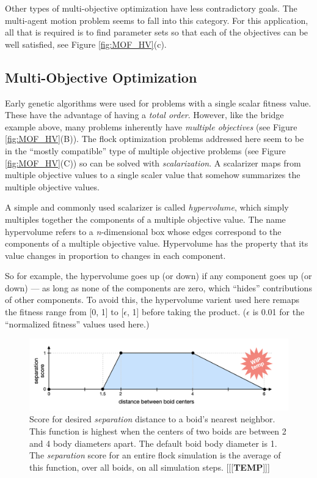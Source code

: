 \documentclass[letterpaper]{article}
\begin{document}
Other types of multi-objective optimization have less contradictory goals. The multi-agent motion problem seems to fall into this category. For this application, all that is required is to find parameter sets so that each of the objectives can be well satisfied, see Figure \ref{fig:MOF_HV}(c).

\subsection{Multi-Objective Optimization}
\label{subsec:Multi-Objective}

Early genetic algorithms were used for problems with a single scalar fitness value. These have the advantage of having a \textit{total order}. However, like the bridge example above, many problems inherently have \textit{multiple objectives} (see Figure \ref{fig:MOF_HV}(B)). The flock optimization problems addressed here seem to be in the ``mostly compatible'' type of multiple objective problems (see Figure \ref{fig:MOF_HV}(C)) so can be solved with \textit{scalarization}. A scalarizer maps from multiple objective values to a single scaler value that somehow summarizes the multiple objective values.

A simple and commonly used scalarizer is called \textit{hypervolume}, which simply multiples together the components of a multiple objective value. The name hypervolume refers to a \textit{n}-dimensional box whose edges correspond to the components of a multiple objective value. Hypervolume has the property that its value changes in proportion to changes in each component.

So for example, the hypervolume goes up (or down) if any component goes up (or down) --- as long as none of the components are zero, which ``hides'' contributions of other components. To avoid this, the hypervolume varient used here remaps the fitness range from [0, 1] to [$\epsilon$, 1] before taking the product. ($\epsilon$ is 0.01 for the ``normalized fitness'' values used here.)


\begin{figure}[t]
    \centering
    \includegraphics[width=0.9\linewidth]{images/temp_sep_score.png}
    \caption{Score for desired \textit{separation} distance to a boid's nearest neighbor. This function is highest when the centers of two boids are between 2 and 4 body diameters apart. The default boid body diameter is 1. The \textit{separation} score for an entire flock simulation is the average of this function, over all boids, on all simulation steps. [[[\textbf{TEMP}]]]}
    \label{fig:SeparationScore}
\end{figure}
\end{document}
